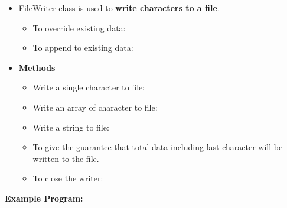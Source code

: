 \setlength{\columnsep}{3pt}
\begin{flushleft}
	
	\begin{itemize}
		\item FileWriter class is used to \textbf{write characters to a file}.
		\begin{itemize}
			\item To override existing data:
			\bigskip
			\item To append to existing data:
			\bigskip
			\bigskip
		\end{itemize}
	
		\item \textbf{Methods}
		\begin{itemize}
			\item Write a single character to file:
			\bigskip
			\item Write an array of character to file:
			\bigskip
			\item Write a string to file:
			\bigskip
			\item To give the guarantee that total data including last character will be written to the file.
			\bigskip
		
			\item To close the writer:
			\bigskip
		\end{itemize}

	\end{itemize}	
			
	\newpage
		\textbf{Example Program:}
		

\end{flushleft}
